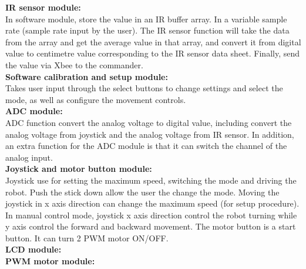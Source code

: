 \documentclass[MTRX3700report.tex]{subfiles}
\begin{document}
\textbf{IR sensor module:}\\
In software module, store the value in an IR buffer array. In a variable sample rate (sample rate input by the user). The IR sensor function will take the data from the array and get the average value in that array, and convert it from digital value to centimetre value corresponding to the IR sensor data sheet. Finally, send the value via Xbee to the commander.\\

\textbf{Software calibration and  setup module:}\\
Takes user input through the select buttons to change settings and select the mode, as well as configure the movement controls.\\



\textbf{ADC module:}\\
ADC function convert the analog voltage to digital value, including convert the analog voltage from joystick and the analog voltage from IR sensor. In addition, an extra function for the ADC module is that it can switch the channel of the analog input.\\
\textbf{Joystick and motor button module:}\\
Joystick use for setting the maximum speed, switching the mode and driving the robot. Push the stick down allow the user the change the mode. Moving the joystick in x axis direction can change the maximum speed (for setup procedure). In manual control mode, joystick x axis direction control the robot turning while y axis control the forward and backward movement. The motor button is a start button. It can turn 2 PWM motor ON/OFF.\\

\textbf{LCD module:}\\

\textbf{PWM motor module:}\\
\end{document}
